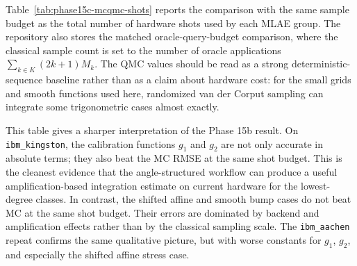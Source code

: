 Table~\ref{tab:phase15c-mcqmc-shots} reports the comparison with the same
sample budget as the total number of hardware shots used by each MLAE group.
The repository also stores the matched oracle-query-budget comparison, where
the classical sample count is set to the number of oracle applications
\(\sum_{k\in K}(2k+1)M_k\). The QMC values should be read as a strong
deterministic-sequence baseline rather than as a claim about hardware cost:
for the small grids and smooth functions used here, randomized van der Corput
sampling can integrate some trigonometric cases almost exactly.

\begin{table}[h]
\centering
{}
\caption{Phase 15c comparison of Phase 15b midpoint-quadrature MLAE hardware
estimates with MC/QMC estimators of the continuous integral. The sample budget
is matched to the total number of hardware shots in each grouped MLAE estimate.}
\label{tab:phase15c-mcqmc-shots}
\end{table}

This table gives a sharper interpretation of the Phase 15b result. On
\texttt{ibm\_kingston}, the calibration functions \(g_1\) and \(g_2\) are not
only accurate in absolute terms; they also beat the MC RMSE at the same shot
budget. This is the cleanest evidence that the angle-structured workflow can
produce a useful amplification-based integration estimate on current hardware
for the lowest-degree classes. In contrast, the shifted affine and smooth bump
cases do not beat MC at the same shot budget. Their errors are dominated by
backend and amplification effects rather than by the classical sampling scale.
The \texttt{ibm\_aachen} repeat confirms the same qualitative picture, but with
worse constants for \(g_1\), \(g_2\), and especially the shifted affine stress
case.

